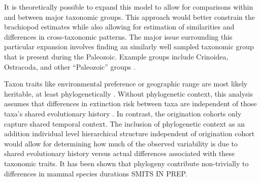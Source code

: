 \documentclass[12pt,letterpaper]{article}
\begin{document}
It is theoretically possible to expand this model to allow for comparisons within and between major taxonomic groups. This approach would better constrain the brachiopod estimates while also allowing for estimation of similarities and differences in cross-taxonomic patterns. The major issue surrounding this particular expansion involves finding an similarly well sampled taxonomic group that is present during the Paleozoic. Example groups include Crinoidea, Ostracoda, and other ``Paleozoic'' groups \citep{SepkoskiJr.1981a}.

Taxon traits like environmental preference or geographic range \citep{Jablonski1987,Hunt2005b} are most likely heritable, at least phylogenetically \citep{Lynch1991,Housworth2004}. Without phylogenetic context, this analysis assumes that differences in extinction risk between taxa are independent of those taxa's shared evolutionary history \citep{Felsenstein1985b}. In contrast, the origination cohorts only capture shared temporal context. The inclusion of phylogenetic context as an addition individual level hierarchical structure independent of origination cohort would allow for determining how much of the observed variability is due to shared evolutionary history versus actual differences associated with these taxonomic traits. It has been shown that phylogeny contribute non-trivially to differences in mammal species durations \uppercase{Smits in prep}.
\end{document}
